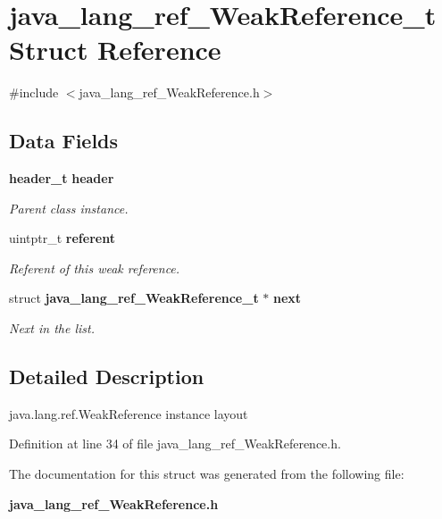 \section{java\_\-lang\_\-ref\_\-WeakReference\_\-t Struct Reference}
\label{structjava__lang__ref___weak_reference__t}


{\ttfamily \#include $<$java\_\-lang\_\-ref\_\-WeakReference.h$>$}

\subsection*{Data Fields}
\begin{DoxyCompactItemize}
\item 
{\bf header\_\-t} {\bf header}\label{structjava__lang__ref___weak_reference__t_aeb9a53aef6b1b9e529ec4194f12a43fe}

\begin{DoxyCompactList}\small\item\em Parent class instance. \item\end{DoxyCompactList}\item 
uintptr\_\-t {\bf referent}\label{structjava__lang__ref___weak_reference__t_aca717f423a9885fa65726075c91b55cb}

\begin{DoxyCompactList}\small\item\em Referent of this weak reference. \item\end{DoxyCompactList}\item 
struct {\bf java\_\-lang\_\-ref\_\-WeakReference\_\-t} $\ast$ {\bf next}\label{structjava__lang__ref___weak_reference__t_ae3b777030fcdfa9f86800e901a5cfc9f}

\begin{DoxyCompactList}\small\item\em Next in the list. \item\end{DoxyCompactList}\end{DoxyCompactItemize}


\subsection{Detailed Description}
java.lang.ref.WeakReference instance layout 

Definition at line 34 of file java\_\-lang\_\-ref\_\-WeakReference.h.



The documentation for this struct was generated from the following file:\begin{DoxyCompactItemize}
\item 
{\bf java\_\-lang\_\-ref\_\-WeakReference.h}\end{DoxyCompactItemize}
